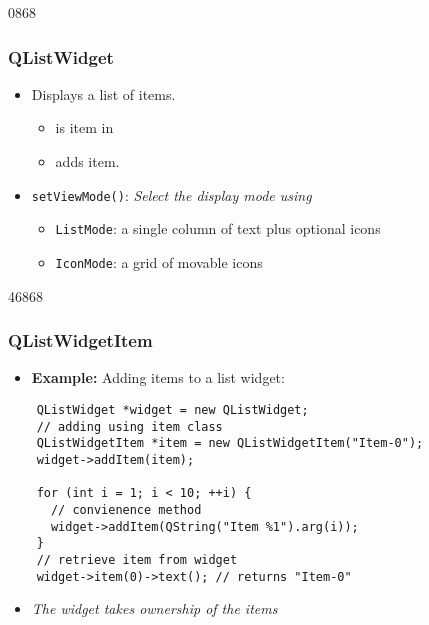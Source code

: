 \begin{slide}{0868}\frametitle{QListWidget}

\begin{itemize}
 \item Displays a list of items.
   \begin{itemize}
   \item {} is item in 
   \item {} adds item.
   \end{itemize}
 \item  \texttt{setViewMode()}: \textit{Select the display mode using}
   \begin{itemize}
   \item \texttt{ListMode}: a single column of text plus optional icons
   \item \texttt{IconMode}: a grid of movable icons
   \end{itemize}
   \end{itemize}
\vfill
\hfill{}\hfill{}\hfill\strut

\end{slide}

\begin{slide}[fragile]{46868}\frametitle{QListWidgetItem}

  \begin{itemize}
  \item \textbf{Example:} Adding items to a list widget:
  \end{itemize}
  \begin{lstlisting}
    QListWidget *widget = new QListWidget;
    // adding using item class
    QListWidgetItem *item = new QListWidgetItem("Item-0");
    widget->addItem(item);
    
    for (int i = 1; i < 10; ++i) {
      // convienence method
      widget->addItem(QString("Item %1").arg(i));
    }
    // retrieve item from widget
    widget->item(0)->text(); // returns "Item-0"
  \end{lstlisting}
  \begin{itemize}
  \item \textit{The widget takes ownership of the items}
 \end{itemize}
\end{slide}

